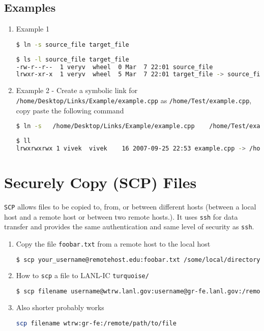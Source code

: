 \subsection{Examples}
\begin{enumerate}
 \item Example 1
\begin{lstlisting}[language=bash,numbers=none] 
$ ln -s source_file target_file
\end{lstlisting}
\begin{lstlisting}[language=bash,numbers=none] 
$ ls -l source_file target_file
-rw-r--r--  1 veryv  wheel  0 Mar  7 22:01 source_file
lrwxr-xr-x  1 veryv  wheel  5 Mar  7 22:01 target_file -> source_file
\end{lstlisting} 
\item Example 2 - Create a symbolic link for \verb+/home/Desktop/Links/Example/example.cpp+ as \verb+/home/Test/example.cpp+,
copy paste the following command
\begin{lstlisting}[language=bash,numbers=none] 
$ ln -s   /home/Desktop/Links/Example/example.cpp    /home/Test/example.cpp
\end{lstlisting}
\begin{lstlisting}[language=bash,numbers=none] 
$ ll
lrwxrwxrwx 1 vivek  vivek    16 2007-09-25 22:53 example.cpp -> /home/Desktop/Links/Example/example.cpp
\end{lstlisting}
\end{enumerate}

\section{Securely Copy (SCP) Files}
\verb+SCP+ allows files to be copied to, from, or between different hosts (between a local host and a remote host or between two remote hosts.).
It uses \verb+ssh+ for data transfer and provides the same authentication and same level of security as \verb+ssh+.
\begin{enumerate}
 \item Copy the file \verb+foobar.txt+ from a remote host to the local host
\begin{lstlisting}[language=bash,numbers=none] 
$ scp your_username@remotehost.edu:foobar.txt /some/local/directory 
\end{lstlisting}
\item How to \verb+scp+ a file to LANL-IC \verb+turquoise/+
\begin{lstlisting}[language=bash,numbers=none] 
$ scp filename username@wtrw.lanl.gov:username@gr-fe.lanl.gov:/remote/path/to/file
\end{lstlisting}
\item Also shorter probably works
\begin{lstlisting}[language=bash,numbers=none] 
scp filename wtrw:gr-fe:/remote/path/to/file
\end{lstlisting}
\end{enumerate}
